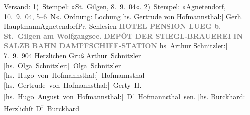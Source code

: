 \begin{ledgroupsized}[t]{13cm}
{\newline{}Versand: 1) Stempel: »\nobreak{}St. Gilgen, 8. 9. 04\nobreak{}«.   2) Stempel: »\nobreak{}Agnetendorf, 1\textcolor{gray}{0}. 9. 04, 5–6 N\nobreak{}«. 
\newline{}Ordnung: Lochung }\pstart{}{\pb}{[}hs. Gertrude von Hofmannsthal:{]} Gerh. Hauptmann\pend{}\pstart{}Agnetendorf\pend{}\pstart{}Pr. Schlesien\pend{}{\bigskip}\pstart
           \noindent{}\centering{}\textcolor{gray}{\textbf{{\pb}HOTEL {\kaufmannsund} PENSION LUEG
                        b. St. Gilgen am Wolfgangsee.}}\pend
           \pstart
           \noindent{}\centering{}\textcolor{gray}{\textbf{DEPÔT DER STIEGL-BRAUEREI IN SALZB}}\pend
           \pstart
           \noindent{}\centering{}\textcolor{gray}{\textbf{BAHN {\kaufmannsund}
                           DAMPFSCHIFF-STATION}}\pend
           \pstart
           \raggedleft{}{[}hs. Arthur Schnitzler:{]} 7. 9. 904\pend
           \pstart
           Herzlichen Gruß \spacefill\mbox{Arthur Schnitzler}\pend
           \pstart
           \spacefill\mbox{{[}hs. Olga Schnitzler:{]} Olga Schnitzler}\pend
           \pstart
           \spacefill\mbox{{[}hs. Hugo von Hofmannsthal:{]} Hofmannsthal}\pend
           \pstart
           \spacefill\mbox{{[}hs. Gertrude von Hofmannsthal:{]} Gerty H.}\pend
           \pstart
           \spacefill\mbox{{[}hs. Hugo August von Hofmannsthal:{]} D\textsuperscript{r}{ }Hofmannsthal sen.}\pend
           \pstart
           {[}hs. Burckhard:{]} Herzlichſt \spacefill\mbox{D\textcolor{gray}{\textsuperscript{r}}{ }Burckhard}\pend
           
         
         \endnumbering{}\end{ledgroupsized}  \newcommand{\dateiname}{L01439}\newcommand{\titel}{Arthur Schnitzler u. a. an Gerhart Hauptmann, 7. 9. 1904}\newcommand{\editorInnen}{Martin Anton Müller und Gerd-Hermann Susen}
      